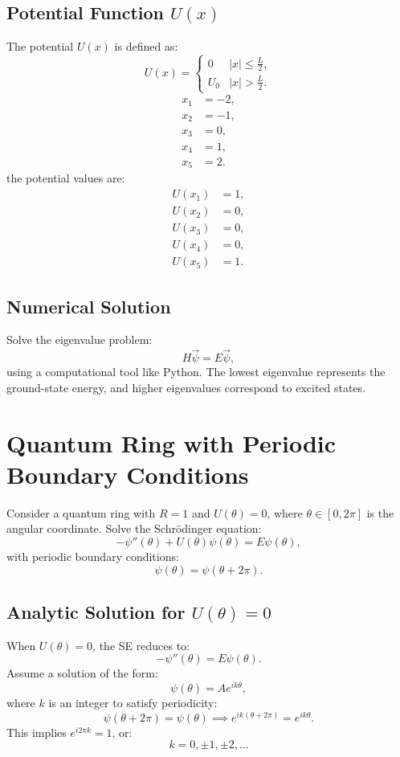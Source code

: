 \documentclass[a4paper,12pt]{article}
\begin{document}
\begin{multicols}{2}
\subsection{Potential Function $U(x)$}
The potential $U(x)$ is defined as:
\[
U(x) =
\begin{cases}
0 & |x| \leq \frac{L}{2}, \\
U_0 & |x| > \frac{L}{2}.
\end{cases}
\]
\[
\begin{aligned}
x_1 &= -2, \\
x_2 &= -1, \\
x_3 &= 0, \\
x_4 &= 1, \\
x_5 &= 2.
\end{aligned}
\]
the potential values are:
\[
\begin{aligned}
U(x_1) &= 1, \\
U(x_2) &= 0, \\
U(x_3) &= 0, \\
U(x_4) &= 0, \\
U(x_5) &= 1.
\end{aligned}
\]

\subsection{Numerical Solution}
Solve the eigenvalue problem:
\[
H\vec{\psi} = E\vec{\psi},
\]
using a computational tool like Python. The lowest eigenvalue represents the ground-state energy, and higher eigenvalues correspond to excited states.

\section{Quantum Ring with Periodic Boundary Conditions}
Consider a quantum ring with $R = 1$ and $U(\theta) = 0$, where $\theta \in [0, 2\pi]$ is the angular coordinate. Solve the Schrödinger equation:
\[
-\psi''(\theta) + U(\theta)\psi(\theta) = E\psi(\theta),
\]
with periodic boundary conditions:
\[
\psi(\theta) = \psi(\theta + 2\pi).
\]

\subsection{Analytic Solution for $U(\theta) = 0$}
When $U(\theta) = 0$, the SE reduces to:
\[
-\psi''(\theta) = E\psi(\theta).
\]
Assume a solution of the form:
\[
\psi(\theta) = Ae^{ik\theta},
\]
where $k$ is an integer to satisfy periodicity:
\[
\psi(\theta + 2\pi) = \psi(\theta) \implies e^{ik(\theta + 2\pi)} = e^{ik\theta}.
\]
This implies $e^{i2\pi k} = 1$, or:
\[
k = 0, \pm 1, \pm 2, \dots
\]


\end{multicols}
\end{document}
